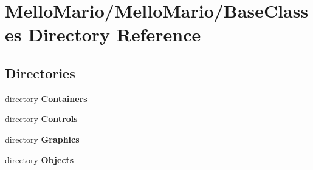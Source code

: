 \section{Mello\+Mario/\+Mello\+Mario/\+Base\+Classes Directory Reference}
\label{dir_3d838512da7ed3475eea1a45fe4922a5}
\subsection*{Directories}
\begin{DoxyCompactItemize}
\item 
directory \textbf{ Containers}
\item 
directory \textbf{ Controls}
\item 
directory \textbf{ Graphics}
\item 
directory \textbf{ Objects}
\end{DoxyCompactItemize}
